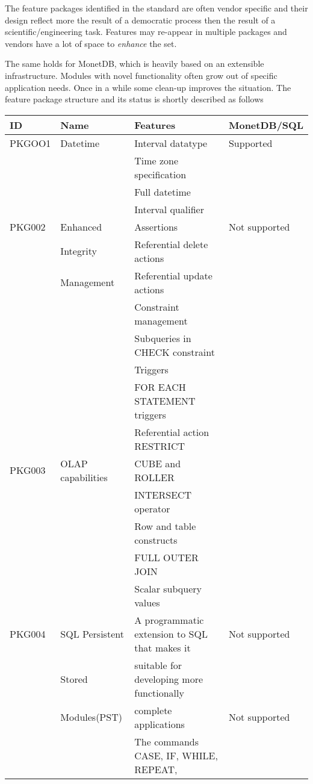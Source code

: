 \documentclass[10pt,twocolumn,fleqn]{article}
\begin{document}
The feature packages identified in the standard are often vendor specific
and their design reflect more the result of a democratic process then
the result of a scientific/engineering task.
Features may re-appear in multiple packages and vendors have a lot of
space to {\em enhance} the set.

The same holds for MonetDB, which is heavily based on an extensible 
infrastructure. Modules with novel functionality often grow out of
specific application needs. Once in a while some clean-up improves
the situation.
The feature package structure and its status is shortly described as follows

\onecolumn
\begin{tabular}{l | l | l| l |}\\
ID	&Name		&Features		&MonetDB/SQL	\\\hline
PKGOO1	&Datetime	&Interval datatype		& Supported\\
	&		&Time zone specification	& \\
	&		&Full datetime			& \\
	&		&Interval qualifier 		& \\
PKG002	&Enhanced 	&Assertions		& Not supported\\
	&Integrity	&Referential delete actions	& \\
	&Management	&Referential update actions& \\
	&		&Constraint management		& \\
	&	 	&Subqueries in CHECK constraint	& \\
	&	 	&Triggers			& \\
	&	 	&FOR EACH STATEMENT triggers	& \\
	&	 	&Referential action RESTRICT	& \\
PKG003	&OLAP capabilities&CUBE and ROLLER		& \\
	& 		&INTERSECT operator		& \\
	&	 	&Row and table constructs	& \\
	&		&FULL OUTER JOIN		& \\
	&	 	&Scalar subquery values		& \\
PKG004	&SQL Persistent	&A programmatic extension to SQL that makes it	& Not supported \\
	&Stored		&suitable for developing more functionally	& \\
	&Modules(PST)	&complete applications	& Not supported\\
	&	 	&The commands CASE, IF, WHILE, REPEAT,	& \\

\end{tabular}
\end{document}
